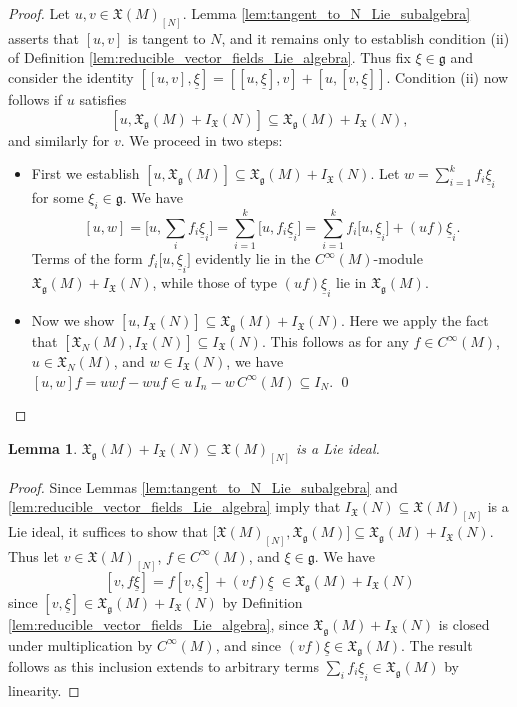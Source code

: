 \documentclass[pdftex]{sigma}
\numberwithin{equation}{section}
\newtheorem{Lemma}[Theorem]{Lemma}
\newcommand{\g}{\mathfrak{g}}
\newcommand{\fgmodule}{\mathfrak{X}_{\g}}
\newcommand{\tgtvf}{\mathfrak X_N(M)}
\newcommand{\vanvf}{I_{\mathfrak{X}}(N)}%
\newcommand{\X}{\mathfrak{X}}
\renewcommand{\subset}{\subseteq}
\begin{document}
\begin{proof}
	Let $u,v\in\X(M)_{[N]}$. Lemma \ref{lem:tangent_to_N_Lie_subalgebra} asserts that $[u,v]$ is tangent to $N$, and it remains only to establish condition (ii) of Definition \ref{lem:reducible_vector_fields_Lie_algebra}. Thus fix $\xi\in\g$ and consider the identity $[[u,v],\underline\xi] = [[u,\underline\xi],v] + [u,[v,\underline\xi]]$.
 Condition (ii) now follows if $u$ satisfies
	\[
		[u, \fgmodule(M)+\vanvf]\subset  \fgmodule(M)+\vanvf,
	\]
	and similarly for $v$. We proceed in two steps:
	\begin{itemize}\itemsep=0pt
		\item First we establish $[u, \fgmodule(M)]\subset  \fgmodule(M)+\vanvf$. Let $w=\sum_{i=1}^k f_i \underline \xi_i$ for some $\xi_i\in\g$. We have
		\[
			[u, w]	= \bigl[u, {\textstyle\sum_i} f_i \underline \xi_i\bigr]
				= \sum_{i=1}^k \bigl[u, f_i\underline\xi_i\bigr]
				= \sum_{i=1}^k f_i\bigl[u,{\underline\xi}_i\bigr]+(uf)\underline\xi_i.
		\]
		Terms of the form $f_i\bigl[u,{\underline\xi}_i\bigr]$ evidently lie in the $C^\infty(M)$-module $\fgmodule(M)+\vanvf$, while those of type $(uf)\underline\xi_i$ lie in $\fgmodule(M)$.

	\item Now we show $[u, \vanvf]\subset  \fgmodule(M)+\vanvf$. Here we apply the fact that $[\tgtvf,\vanvf]\subset \vanvf$. This follows as for any $f\in C^\infty(M)$, $u\in \tgtvf$, and $w\in \vanvf$, we have $[u,w]f=uwf-wuf\in u\,I_n-w\,C^\infty(M)\subset I_N$.
\hfill\qed
\end{itemize}
\renewcommand{\qed}{}
\end{proof}

\begin{Lemma}\label{lem:Xg+I_X_is_a_Lie_ideal}
	$\X_\g(M)+I_\X(N)\subset\X(M)_{[N]}$ is a Lie ideal.
\end{Lemma}

\begin{proof}
	Since Lemmas \ref{lem:tangent_to_N_Lie_subalgebra} and \ref{lem:reducible_vector_fields_Lie_algebra} imply that $I_\X(N)\subset\X(M)_{[N]}$ is a Lie ideal, it suffices to show that $\bigl[\X(M)_{[N]},\X_\g(M)\bigr]\subset \X_\g(M)+I_\X(N)$. Thus let $v\in\X(M)_{[N]}$, $f\in C^\infty(M)$, and $\xi\in\g$. We have
	\[
		[v,f\underline\xi] = f[v,\underline\xi] + (vf)\underline\xi \;\in \X_\g(M) + I_\X(N)
	\]
	since $[v,\underline\xi]\in\X_\g(M)+I_\X(N)$ by Definition \ref{lem:reducible_vector_fields_Lie_algebra}, since $\X_\g(M)+I_\X(N)$ is closed under multiplication by $C^\infty(M)$, and since $(vf)\underline\xi\in\X_\g(M)$. The result follows as this inclusion extends to arbitrary terms $\sum_if_i\underline\xi_i\in\X_\g(M)$ by linearity.
\end{proof}
\end{document}
